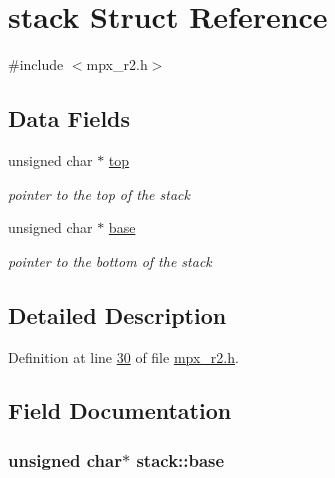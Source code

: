 \hypertarget{structstack}{
\section{stack Struct Reference}
\label{structstack}
}


{\ttfamily \#include $<$mpx\_\-r2.h$>$}

\subsection*{Data Fields}
\begin{DoxyCompactItemize}
\item 
unsigned char $\ast$ \hyperlink{structstack_adf145fa22a24464ff19409e2618a583d}{top}
\begin{DoxyCompactList}\small\item\em pointer to the top of the stack \item\end{DoxyCompactList}\item 
unsigned char $\ast$ \hyperlink{structstack_a1cdb71e486a79747d482aa46f6b10290}{base}
\begin{DoxyCompactList}\small\item\em pointer to the bottom of the stack \item\end{DoxyCompactList}\end{DoxyCompactItemize}


\subsection{Detailed Description}


Definition at line \hyperlink{mpx__r2_8h_source_l00030}{30} of file \hyperlink{mpx__r2_8h_source}{mpx\_\-r2.h}.



\subsection{Field Documentation}
\hypertarget{structstack_a1cdb71e486a79747d482aa46f6b10290}{
\subsubsection[{base}]{\setlength{\rightskip}{0pt plus 5cm}unsigned char$\ast$ {\bf stack::base}}}
\label{structstack_a1cdb71e486a79747d482aa46f6b10290}


